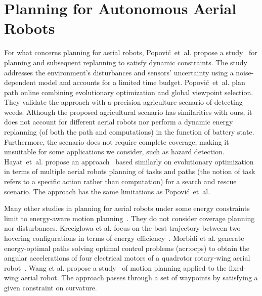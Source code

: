 \section{Planning for Autonomous Aerial Robots}
\label{sec:soa-aerial-pl}

For what concerns planning for aerial robots, Popovi\'{c}~et~al. propose a study~\citep{popovic2017online} for planning and subsequent replanning to satisfy dynamic constraints. The study addresses the environment's disturbances and sensors' uncertainty using a noise-dependent model and accounts for a limited time budget. Popovi\'{c}~et~al. plan path online combining evolutionary optimization and global viewpoint selection. They validate the approach with a precision agriculture scenario of detecting weeds. Although the proposed agricultural scenario has similarities with ours, it does not account for different aerial robots nor perform a dynamic energy replanning (of both the path and computations) in the function of battery state. Furthermore, the scenario does not require complete coverage, making it unsuitable for some applications we consider, such as hazard detection. Hayat~et~al. propose an approach~\citep{hayat2017multi} based similarly on evolutionary optimization in terms of multiple aerial robots planning of tasks and paths (the notion of task refers to a specific action rather than computation) for a search and rescue scenario. The approach has the same limitations as Popovi\'{c}~et~al.

Many other studies in planning for aerial robots under some energy constraints limit to energy-aware motion planning~\citep{wang2017curvature,morbidi2016minimum,kreciglowa2017energy}. They do not consider coverage planning nor disturbances. Kreciglowa et al. focus on the best trajectory between two hovering configurations in terms of energy efficiency~\citep{kreciglowa2017energy}. Morbidi et al. generate energy-optimal paths solving optimal control problems (\Gls{acr:ocp}s) to obtain the angular accelerations of four electrical motors of a quadrotor rotary-wing aerial robot~\citep{morbidi2016minimum}. 
Wang et al. propose a study~\citep{wang2017curvature}  of motion planning applied to the fixed-wing aerial robot. The approach passes through a set of waypoints by satisfying a given constraint on curvature.


